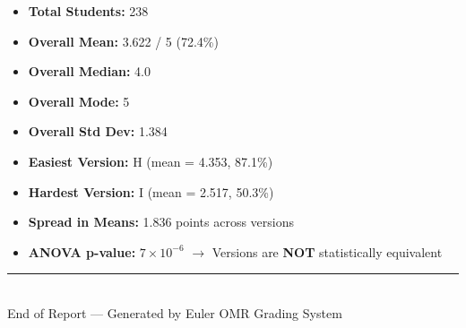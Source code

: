 \documentclass[12pt, a4paper]{article}
\begin{document}
	\begin{summarybox}
		\begin{itemize}[leftmargin=*, itemsep=4pt]
			\item \textbf{Total Students:} 238
			\item \textbf{Overall Mean:} 3.622 / 5 \quad (72.4\%)
			\item \textbf{Overall Median:} 4.0
			\item \textbf{Overall Mode:} 5
			\item \textbf{Overall Std Dev:} 1.384
			\item \textbf{Easiest Version:} H \quad (mean = 4.353, 87.1\%)
			\item \textbf{Hardest Version:} I \quad (mean = 2.517, 50.3\%)
			\item \textbf{Spread in Means:} 1.836 points across versions
			\item \textbf{ANOVA p-value:} $7 \times 10^{-6}$ \quad
			\textcolor{danger}{$\rightarrow$ Versions are \textbf{NOT} statistically equivalent}
		\end{itemize}
	\end{summarybox}
	
	\vfill
	\begin{center}
		\textcolor{medgray}{\small\rule{0.4\textwidth}{0.4pt} \\[4pt]
			End of Report — Generated by Euler OMR Grading System}
	\end{center}
	
\end{document}

